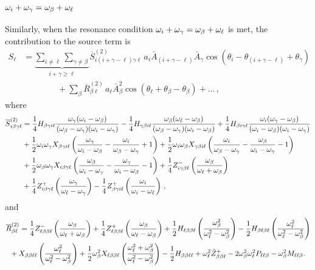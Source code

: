 \documentclass[../PhD.tex]{subfiles}
\newcommand{\obet}{\omega_{\beta}}
\newcommand{\ogam}{\omega_\gamma}
\begin{document}
\subsubsection{$\oi + \ogam = \obet + \ol$}
\label{ssec: intpluschi2}

Similarly, when the resonance condition $\oi + \ogam = \obet + \ol$ is met, the contribution to the source term is
\begin{align}
\label{intpluschi2 source}
S_\ell &= \underbrace{\sum_{i \neq \ell} \sum_{\gamma \neq \beta}}_{i + \gamma \geq \ell} \overline{S}^{(2)}_{i (i + \gamma - \ell) \gamma \ell} \, a_i \bar A_{(i + \gamma - \ell)} \bar A_\gamma \cos \left( \theta_i - \theta_{(i + \gamma - \ell)}  + \theta_\gamma \right) \nonumber \\
%
& \qquad \qquad + \sum_\beta \overline{R}^{(2)}_{\beta\ell} \, a_\ell \bar A_\beta^2 \cos \left( \theta_\ell + \theta_\beta - \theta_\beta \right) + \ldots \, ,
\end{align}
where
\begin{align}
\overline{S}^{(2)}_{i\beta\gamma\ell} &= \frac{1}{4} H_{\beta\gamma i\ell} \frac{\ogam (\oi - \obet)}{(\obet - \ogam)(\oi - \ogam)} - \frac{1}{4} H_{\gamma\beta i \ell} \frac{\obet(\ol - \obet)}{(\obet - \ogam)(\oi - \obet)} + \frac{1}{4} H_{\beta i \gamma\ell} \frac{\oi (\ogam - \obet)}{(\oi - \obet)(\oi - \ogam)} \nonumber \\
%
& + \frac{1}{2} \oi \ogam X_{\beta\gamma i \ell} \left( \frac{\ogam}{\oi - \obet} - \frac{\oi}{\obet - \ogam} + 1 \right) + \frac{1}{2} \oi \obet X_{\gamma\beta i \ell} \left( \frac{\oi}{\obet - \ogam} - \frac{\obet}{\oi - \ogam} - 1 \right) \nonumber \\
%
& + \frac{1}{2} \obet \ogam X_{i\beta\gamma\ell} \left( \frac{\obet}{\oi - \ogam} - \frac{\ogam}{\oi - \obet} - 1 \right)  + \frac{1}{4} Z^-_{i\gamma\beta\ell} \left( \frac{\obet}{\ol + \obet}\right)  \nonumber \\
%
&
+ \frac{1}{4} Z^+_{i\beta\gamma\ell} \left( \frac{\ogam}{\ol - \ogam}\right) - \frac{1}{4}Z^+_{\beta\gamma i \ell} \left( \frac{\oi}{\oi - \ol} \right) \, ,
\end{align}
and
\begin{align}
\overline{R}^{(2)}_{\beta\ell} &= \frac{1}{4} Z^-_{\ell\beta\beta\ell} \left( \frac{\obet}{\ol + \obet} \right) + \frac{1}{4} Z^+_{\ell\beta\beta\ell} \left( \frac{\obet}{\ol - \obet} \right) + \frac{1}{2} H_{\ell\beta\beta\ell} \left( \frac{\obet^2}{\ol^2 - \obet^2} \right) - \frac{1}{2} H_{\beta\ell\beta\ell} \left( \frac{\ol^2}{\ol^2 - \obet^2} \right) \nonumber \\
%
& \!\!\!\!\!\!\!\! + X_{\beta\beta\ell\ell} \left( \frac{\ol^2}{\ol^2 - \obet^2} \right) + \frac{1}{2} \obet^2 X_{\ell\beta\beta\ell} \left( \frac{\ol^2 + \obet^2}{\ol^2 - \obet^2} \right) - \frac{1}{2} H_{\beta\beta\ell\ell} +  \ol^2 \tilde{Z}^+_{\beta\beta\ell} - 2 \obet^2 \ol^2 P_{\ell\ell\beta} - \obet^2 M_{\ell\ell\beta} . \vspace{-0.3in}
\end{align}
\end{document}
